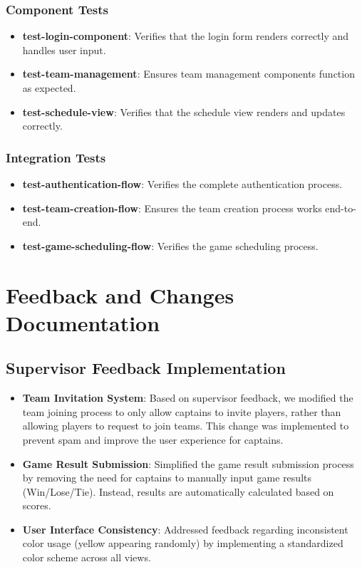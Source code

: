 \documentclass[12pt, titlepage]{article}
\begin{document}
\subsubsection{Component Tests}
\begin{itemize}
    \item \textbf{test-login-component}: Verifies that the login form renders correctly and handles user input.
    \item \textbf{test-team-management}: Ensures team management components function as expected.
    \item \textbf{test-schedule-view}: Verifies that the schedule view renders and updates correctly.
\end{itemize}

\subsubsection{Integration Tests}
\begin{itemize}
    \item \textbf{test-authentication-flow}: Verifies the complete authentication process.
    \item \textbf{test-team-creation-flow}: Ensures the team creation process works end-to-end.
    \item \textbf{test-game-scheduling-flow}: Verifies the game scheduling process.
\end{itemize}

\section{Feedback and Changes Documentation}

\subsection{Supervisor Feedback Implementation}

\begin{itemize}
    \item \textbf{Team Invitation System}: Based on supervisor feedback, we modified the team joining process to only allow captains to invite players, rather than allowing players to request to join teams. This change was implemented to prevent spam and improve the user experience for captains.
    \item \textbf{Game Result Submission}: Simplified the game result submission process by removing the need for captains to manually input game results (Win/Lose/Tie). Instead, results are automatically calculated based on scores.
    \item \textbf{User Interface Consistency}: Addressed feedback regarding inconsistent color usage (yellow appearing randomly) by implementing a standardized color scheme across all views.
\end{itemize}
\end{document}
